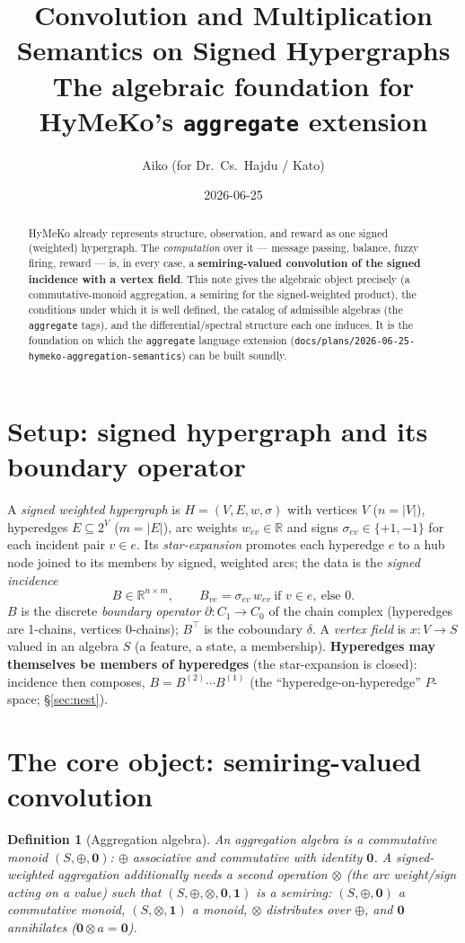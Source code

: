 \documentclass[11pt]{article}
\title{Convolution and Multiplication Semantics on Signed Hypergraphs\\
\large The algebraic foundation for HyMeKo's \texttt{aggregate} extension}
\author{Aiko (for Dr.\ Cs.\ Hajdu / Kato)}
\date{2026-06-25}
\newtheorem{definition}{Definition}
\begin{document}
\maketitle

\begin{abstract}
HyMeKo already represents structure, observation, and reward as one signed (weighted) hypergraph. The
\emph{computation} over it --- message passing, balance, fuzzy firing, reward --- is, in every case, a
\textbf{semiring-valued convolution of the signed incidence with a vertex field}. This note gives the algebraic
object precisely (a commutative-monoid aggregation, a semiring for the signed-weighted product), the conditions
under which it is well defined, the catalog of admissible algebras (the \texttt{aggregate} tags), and the
differential/spectral structure each one induces. It is the foundation on which the \texttt{aggregate} language
extension (\texttt{docs/plans/2026-06-25-hymeko-aggregation-semantics}) can be built soundly.
\end{abstract}

\section{Setup: signed hypergraph and its boundary operator}
A \emph{signed weighted hypergraph} is $H=(V,E,w,\sigma)$ with vertices $V$ ($n=|V|$), hyperedges
$E\subseteq 2^V$ ($m=|E|$), arc weights $w_{ev}\in\mathbb{R}$ and signs $\sigma_{ev}\in\{+1,-1\}$ for each
incident pair $v\in e$. Its \emph{star-expansion} promotes each hyperedge $e$ to a hub node joined to its members
by signed, weighted arcs; the data is the \emph{signed incidence}
\[
B\in\mathbb{R}^{n\times m},\qquad B_{ve}=\sigma_{ev}\,w_{ev}\ \text{if } v\in e,\ \text{else } 0 .
\]
$B$ is the discrete \emph{boundary operator} $\partial:C_1\!\to\!C_0$ of the chain complex (hyperedges are
1-chains, vertices 0-chains); $B^{\!\top}$ is the coboundary $\delta$. A \emph{vertex field} is $x:V\to S$ valued
in an algebra $S$ (a feature, a state, a membership). \textbf{Hyperedges may themselves be members of hyperedges}
(the star-expansion is closed): incidence then composes, $B=B^{(2)}\!\cdots B^{(1)}$ (the ``hyperedge-on-hyperedge''
$P$-space; \S\ref{sec:nest}).

\section{The core object: semiring-valued convolution}
\begin{definition}[Aggregation algebra]
An \emph{aggregation algebra} is a commutative monoid $(S,\oplus,\mathbf{0})$: $\oplus$ associative and
commutative with identity $\mathbf{0}$. A \emph{signed-weighted aggregation} additionally needs a second operation
$\otimes$ (the arc weight/sign acting on a value) such that $(S,\oplus,\otimes,\mathbf{0},\mathbf{1})$ is a
\emph{semiring}: $(S,\oplus,\mathbf 0)$ a commutative monoid, $(S,\otimes,\mathbf 1)$ a monoid, $\otimes$
distributes over $\oplus$, and $\mathbf 0$ annihilates ($\mathbf 0\otimes a=\mathbf 0$).
\end{definition}
\end{document}
